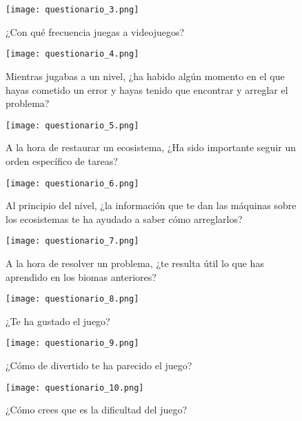 \begin{figure}[H]
  \centering
  \texttt{[image: questionario\_3.png]}
  \caption{¿Con qué frecuencia juegas a videojuegos?}
  \label{fig:questionario_3}
\end{figure}
\raggedbottom

\begin{figure}[H]
  \centering
  \texttt{[image: questionario\_4.png]}
  \caption{Mientras jugabas a un nivel, ¿ha habido algún momento en el que hayas cometido un error y hayas tenido que encontrar y arreglar el problema?}
  \label{fig:questionario_4}
\end{figure}
\raggedbottom

\begin{figure}[H]
  \centering
  \texttt{[image: questionario\_5.png]}
  \caption{A la hora de restaurar un ecosistema, ¿Ha sido importante seguir un orden específico de tareas?}
  \label{fig:questionario_5}
\end{figure}
\raggedbottom

\begin{figure}[H]
  \centering
  \texttt{[image: questionario\_6.png]}
  \caption{Al principio del nivel, ¿la información que te dan las máquinas sobre los ecosistemas te ha ayudado a saber cómo arreglarlos?}
  \label{fig:questionario_6}
\end{figure}
\raggedbottom

\begin{figure}[H]
  \centering
  \texttt{[image: questionario\_7.png]}
  \caption{A la hora de resolver un problema, ¿te resulta útil lo que has aprendido en los biomas anteriores?}
  \label{fig:questionario_7}
\end{figure}
\raggedbottom

\begin{figure}[H]
  \centering
  \texttt{[image: questionario\_8.png]}
  \caption{¿Te ha gustado el juego?}
  \label{fig:questionario_8}
\end{figure}
\raggedbottom

\begin{figure}[H]
  \centering
  \texttt{[image: questionario\_9.png]}
  \caption{¿Cómo de divertido te ha parecido el juego?}
  \label{fig:questionario_9}
\end{figure}
\raggedbottom

\begin{figure}[H]
  \centering
  \texttt{[image: questionario\_10.png]}
  \caption{¿Cómo crees que es la dificultad del juego?}
  \label{fig:questionario_10}
\end{figure}
\raggedbottom

